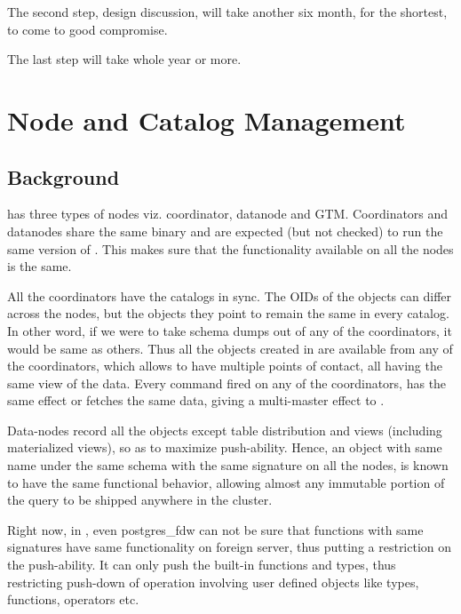 	The second step, design discussion, will take another six month, for the shortest,
	to come to good compromise.

	The last step will take whole year or more.



\section{Node and Catalog Management}



\subsection{Background}

	\XC{} has three types of nodes viz.{} coordinator, datanode and GTM.
	Coordinators and datanodes share the same binary and are expected
	(but not checked) to run the same version of \XC.
	This makes sure that the functionality available on all the nodes is the same.

	All the coordinators have the catalogs in sync.
	The OIDs of the objects can differ across the nodes, but the objects they point
	to remain the same in every catalog.
	In other word, if we were to take schema dumps out of any of the coordinators,
	it would be same as others.
	Thus all the objects created in \XC{} are available from any of the coordinators,
	which allows to have multiple points of contact, all having the same view of the data.
	Every command fired on any of the coordinators, has the same effect or fetches the same
	data, giving a multi-master effect to \XC. 

	Data-nodes record all the objects except table distribution and views (including materialized
	views), so as to maximize push-ability.
	Hence, an object with same name under the same schema with the same signature on all the
	nodes, is known to have the same functional behavior, allowing almost any immutable
	portion of the query to be shipped anywhere in the \XC{} cluster.

	Right now, in \PG, even postgres\_fdw can not be sure that functions with same
	signatures have same functionality on foreign \PG{} server, thus putting a
	restriction on the push-ability.
	It can only push the built-in functions and types, thus restricting push-down of
	operation involving user defined objects like types, functions, operators etc. 


